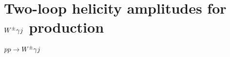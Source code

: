 \documentclass[main.tex]{subfiles}
\begin{document}
\chapter{Two-loop helicity amplitudes for $W^\pm \gamma j$ production} \label{sec:Wyj}
$pp \rightarrow W^\pm \gamma j$
\end{document}
